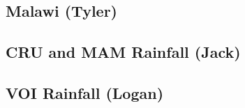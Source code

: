 \documentclass[]{article}
\begin{document}
\hypertarget{malawi-tyler}{%
\subsection{Malawi (Tyler)}\label{malawi-tyler}}

\hypertarget{cru-and-mam-rainfall-jack}{%
\subsection{CRU and MAM Rainfall
(Jack)}\label{cru-and-mam-rainfall-jack}}

\hypertarget{voi-rainfall-logan}{%
\subsection{VOI Rainfall (Logan)}\label{voi-rainfall-logan}}
\end{document}
